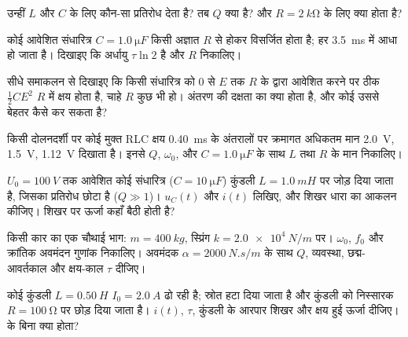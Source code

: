 \begin{exercise}[$\star$]\label{exo:b1:transient-regimes:4}
उन्हीं $L$ और $C$ के लिए कौन-सा प्रतिरोध  देता है?
तब $Q$ क्या है? और $R = \qty{2}{k\ohm}$ के लिए क्या होता है?
\end{exercise}

\begin{exercise}[$\star\star$]\label{exo:b1:transient-regimes:5}
कोई आवेशित संधारित्र $C = \qty{1.0}{\micro F}$ किसी अज्ञात $R$ से होकर
विसर्जित होता है;  हर \qty{3.5}{ms} में आधा हो जाता है। दिखाइए कि
अर्धायु $\tau\ln 2$ है और $R$ निकालिए।
\end{exercise}

\begin{exercise}[$\star\star$]\label{exo:b1:transient-regimes:6}
सीधे समाकलन से दिखाइए कि किसी संधारित्र को $0$ से $E$ तक $R$ के द्वारा
आवेशित करने पर ठीक $\tfrac12 CE^2$ $R$ में क्षय होता है, चाहे
$R$ कुछ भी हो। अंतरण की दक्षता का क्या होता है, और कोई उससे बेहतर कैसे कर
सकता है?
\end{exercise}

\begin{exercise}[$\star\star$]\label{exo:b1:transient-regimes:7}
किसी दोलनदर्शी पर कोई मुक्त RLC क्षय \qty{0.40}{ms} के अंतरालों पर क्रमागत
अधिकतम मान \qty{2.0}{V}, \qty{1.5}{V}, \qty{1.12}{V} दिखाता है।
इनसे $Q$, $\omega_0$, और $C = \qty{1.0}{\micro F}$ के साथ $L$ तथा $R$ के मान
निकालिए।
\end{exercise}

\begin{exercise}[$\star\star$]\label{exo:b1:transient-regimes:8}
$U_0 = \qty{100}{V}$ तक आवेशित कोई संधारित्र ($C = \qty{10}{\micro F}$)
कुंडली $L = \qty{1.0}{mH}$ पर जोड़ दिया जाता है, जिसका प्रतिरोध छोटा है ($Q \gg 1$)।
$u_C(t)$ और $i(t)$ लिखिए, और शिखर धारा का आकलन कीजिए। शिखर पर ऊर्जा कहाँ
बैठी होती है?
\end{exercise}

\begin{exercise}[$\star\star$]\label{exo:b1:transient-regimes:9}
किसी कार का एक चौथाई भाग: $m = \qty{400}{kg}$, स्प्रिंग $k = \qty{2.0e4}{N/m}$ पर।
$\omega_0$, $f_0$ और क्रांतिक अवमंदन गुणांक निकालिए। अवमंदक
$\alpha = \qty{2000}{N.s/m}$ के साथ $Q$, व्यवस्था,
छद्म-आवर्तकाल और क्षय-काल $\tau$ दीजिए।
\end{exercise}

\begin{exercise}[$\star\star\star$]\label{exo:b1:transient-regimes:10}
कोई कुंडली $L = \qty{0.50}{H}$ $I_0 = \qty{2.0}{A}$ ढो रही है; स्रोत
हटा दिया जाता है और कुंडली को निस्सारक  $R = \qty{100}{\ohm}$ पर छोड़ दिया जाता है।
$i(t)$, $\tau$, कुंडली के आरपार शिखर  और क्षय हुई ऊर्जा
दीजिए।  के बिना क्या होता?
\end{exercise}

